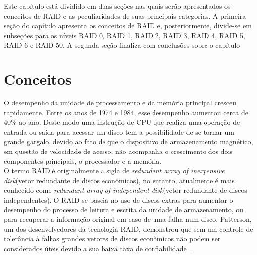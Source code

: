 Este capítulo está dividido em duas seções nas quais serão apresentados os conceitos de RAID e as peculiaridades de suas principais categorias. A primeira seção do capítulo apresenta os conceitos de RAID e, posteriormente, divide-se em subseções para os níveis RAID 0, RAID 1, RAID 2, RAID 3, RAID 4, RAID 5, RAID 6 e RAID 50. A segunda seção finaliza com conclusões sobre o capítulo

\section{Conceitos}
O desempenho da unidade de processamento e da memória principal cresceu rapidamente. Entre os anos de 1974 e 1984, esse desempenho aumentou cerca de 40\% ao ano. Deste modo uma instrução de CPU que realiza uma operação de entrada ou saída para acessar um disco tem a possibilidade de se tornar um grande gargalo, devido ao fato de que o dispositivo de armazenamento magnético, em questão de velocidade de acesso, não acompanha o crescimento dos dois componentes principais, o processador e a memória.\\

O termo RAID é originalmente a sigla de \textit{redundant array of inexpensive disk}(vetor redundante de discos econômicos), no entanto, atualmente é mais conhecido como \textit{redundant array of independent disk}(vetor redundante de discos independentes). O RAID se baseia no uso de discos extras para aumentar o desempenho do processo de leitura e escrita da unidade de armazenamento, ou para recuperar a informação original em caso de uma falha num disco. Patterson, um dos desenvolvedores da tecnologia RAID, demonstrou que sem um controle de tolerância à falhas grandes vetores de discos econômicos não podem ser considerados úteis devido a sua baixa taxa de confiabilidade~\cite{patterson88}. \\


